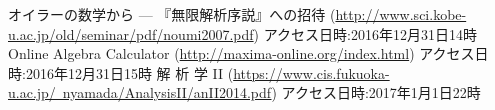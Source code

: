 \documentclass[10pt,onecolumn,dvipdfmx]{jsarticle}
\begin{document}
\begin{thebibliography}{9}
 オイラーの数学から — 『無限解析序説』への招待 (\href{http://www.sci.kobe-u.ac.jp/old/seminar/pdf/noumi2007.pdf}{http://www.sci.kobe-u.ac.jp/old/seminar/pdf/noumi2007.pdf}) アクセス日時:2016年12月31日14時
 Online Algebra Calculator (\href{http://maxima-online.org/index.html}{http://maxima-online.org/index.html}) アクセス日時:2016年12月31日15時
 解 析 学 II (\href{https://www.cis.fukuoka-u.ac.jp/~nyamada/AnalysisII/anII2014.pdf}{https://www.cis.fukuoka-u.ac.jp/~nyamada/AnalysisII/anII2014.pdf}) アクセス日時:2017年1月1日22時
\end{thebibliography}
\end{document}
